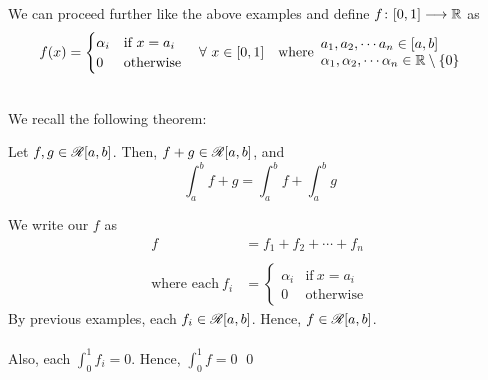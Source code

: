 \documentclass[a4paper]{book}
\begin{document}
\begin{exampleT}
We can proceed further like the above examples and define $f\colon [0,1] \longrightarrow \mathbb{R}$ as
\begin{align*}
f(x) &= \begin{cases}
\alpha_i & \text{if } x = a_i \\
0 & \text{otherwise}
\end{cases}\quad \forall\ x \in [0,1] \quad \text{where}
\begin{array}{l l}
a_1, a_2, \cdots a_n \in [a,b] \\
\alpha_1, \alpha_2, \cdots \alpha_n \in \mathbb{R} \setminus \qty{0}
\end{array}
\end{align*}
\begin{figure}[h]
\centering
{}
\end{figure} \\
We recall the following theorem:
\begin{theorem}
Let $f,g \in \mathscr{R}[a,b]$. Then, $f + g \in \mathscr{R}[a,b]$, and \[\int_a^b f+g = \int_a^b f  + \int_a^b g\]
\end{theorem}
\noindent We write our $f$ as 
\begin{align*}
f &= f_1 + f_2 + \cdots + f_n \\ \\
\text{where each}\ f_i &= \begin{cases} 
\alpha_i & \text{if}\ x = a_i \\
0 & \text{otherwise}
\end{cases}
\end{align*}
By previous examples, each $f_i \in \mathscr{R}[a,b]$. Hence, $f \in \mathscr{R}[a,b]$. \\ \\
Also, each $\displaystyle \int_0^1 f_i = 0$. Hence, $\displaystyle \int_0^1 f = 0$ \qed
\end{exampleT}
\end{document}
